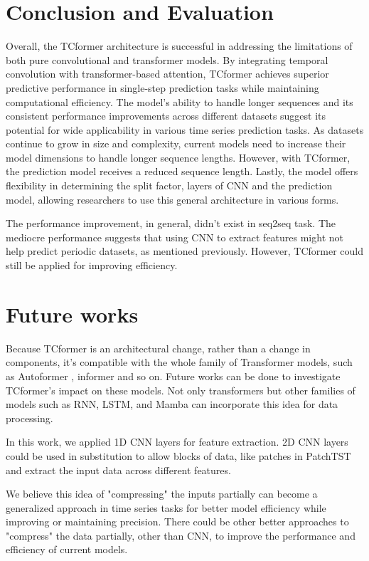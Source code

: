 \documentclass[stu,12pt,floatsintext]{apa7}
\begin{document}
\section{Conclusion and Evaluation}

Overall, the TCformer architecture is successful in addressing the limitations of both pure convolutional and transformer models. By integrating temporal convolution with transformer-based attention, TCformer achieves superior predictive performance in single-step prediction tasks while maintaining computational efficiency. The model's ability to handle longer sequences and its consistent performance improvements across different datasets suggest its potential for wide applicability in various time series prediction tasks. As datasets continue to grow in size and complexity, current models need to increase their model dimensions to handle longer sequence lengths. However, with TCformer, the prediction model receives a reduced sequence length. Lastly, the model offers flexibility in determining the split factor, layers of CNN and the prediction model, allowing researchers to use this general architecture in various forms. 

The performance improvement, in general, didn't exist in seq2seq task. The mediocre performance suggests that using CNN to extract features might not help predict periodic datasets, as mentioned previously. However, TCformer could still be applied for improving efficiency.

\section{Future works}

Because TCformer is an architectural change, rather than a change in components, it's compatible with the whole family of Transformer models, such as Autoformer \cite{autoformer}, informer \cite{informer} and so on. Future works can be done to investigate TCformer's impact on these models. Not only transformers but other families of models such as RNN, LSTM, and Mamba \cite{mamba2} can incorporate this idea for data processing. 

In this work, we applied 1D CNN layers for feature extraction. 2D CNN layers could be used in substitution to allow blocks of data, like patches in PatchTST \cite{nie2023timeseriesworth64} and extract the input data across different features. 

We believe this idea of "compressing" the inputs partially can become a generalized approach in time series tasks for better model efficiency while improving or maintaining precision. There could be other better approaches to "compress" the data partially, other than CNN, to improve the performance and efficiency of current models. 
\end{document}

